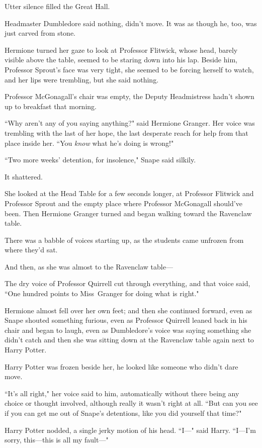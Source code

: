 Utter silence filled the Great Hall.

Headmaster Dumbledore said nothing, didn't move. It was as though he, too, was just carved from stone.

Hermione turned her gaze to look at Professor Flitwick, whose head, barely visible above the table, seemed to be staring down into his lap. Beside him, Professor Sprout's face was very tight, she seemed to be forcing herself to watch, and her lips were trembling, but she said nothing.

Professor McGonagall's chair was empty, the Deputy Headmistress hadn't shown up to breakfast that morning.

``Why aren't any of you saying anything?" said Hermione Granger. Her voice was trembling with the last of her hope, the last desperate reach for help from that place inside her. ``You \emph{know} what he's doing is wrong!"

``Two more weeks' detention, for insolence," Snape said silkily.

It shattered.

She looked at the Head Table for a few seconds longer, at Professor Flitwick and Professor Sprout and the empty place where Professor McGonagall should've been. Then Hermione Granger turned and began walking toward the Ravenclaw table.

There was a babble of voices starting up, as the students came unfrozen from where they'd sat.

And then, as she was almost to the Ravenclaw table—

The dry voice of Professor Quirrell cut through everything, and that voice said, ``One hundred points to Miss~Granger for doing what is right."

Hermione almost fell over her own feet; and then she continued forward, even as Snape shouted something furious, even as Professor Quirrell leaned back in his chair and began to laugh, even as Dumbledore's voice was saying something she didn't catch and then she was sitting down at the Ravenclaw table again next to Harry Potter.

Harry Potter was frozen beside her, he looked like someone who didn't dare move.

``It's all right," her voice said to him, automatically without there being any choice or thought involved, although really it wasn't right at all. ``But can you see if you can get me out of Snape's detentions, like you did yourself that time?"

Harry Potter nodded, a single jerky motion of his head. ``I—" said Harry. ``I—I'm sorry, this—this is all my fault—"

